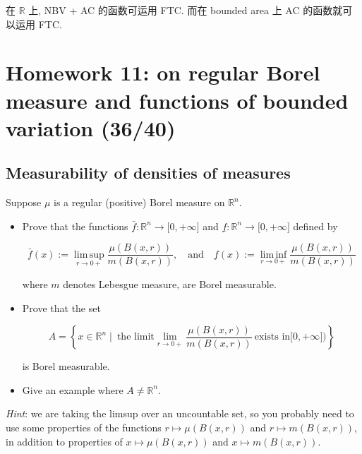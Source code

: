 \documentclass{qlnotes-export}
\begin{document}
在 \(\mathbb{R}\) 上, NBV + AC 的函数可运用 FTC. 而在 bounded area 上 AC 的函数就可以运用 FTC.

\chapter{Homework 11: on regular Borel measure and functions of bounded variation (36/40)}\label{homework-11-on-regular-borel-measure-and-functions-of-bounded-variation-3640}

\section{Measurability of densities of measures}\label{measurability-of-densities-of-measures}

Suppose \(\mu\) is a regular (positive) Borel measure on \({\mathbb{R}}^{n}\).

\begin{itemize}
\item
  Prove that the functions \(\bar{f}:{\mathbb{R}}^{n}\rightarrow\lbrack 0, + \infty\rbrack\) and \(\underset{¯}{f}:{\mathbb{R}}^{n}\rightarrow\lbrack 0, + \infty\rbrack\) defined by

  \[\bar{f}(x) := \operatorname{lim\, sup}\limits_{r\rightarrow 0 +}\frac{\mu(B(x,r))}{m(B(x,r))},\quad\text{and}\quad\underset{¯}{f}(x) := \operatorname{lim\, inf}\limits_{r\rightarrow 0 +}\frac{\mu(B(x,r))}{m(B(x,r))}\]

  where \(m\) denotes Lebesgue measure, are Borel measurable.
\item
  Prove that the set

  \[A = \left\{ {x \in {\mathbb{R}}^{n} \mid \ \text{the limit}\lim\limits_{r\rightarrow 0 +}\frac{\mu(B(x,r))}{m(B(x,r))}\ \text{exists in}\lbrack 0, + \infty\rbrack\text{)}} \right\}\]

  is Borel measurable.
\item
  Give an example where \(A \neq {\mathbb{R}}^{n}\).
\end{itemize}

\emph{Hint}: we are taking the limsup over an uncountable set, so you probably need to use some properties of the functions \(r\mapsto\mu(B(x,r))\) and \(r\mapsto m(B(x,r))\), in addition to properties of \(x\mapsto\mu(B(x,r))\) and \(x\mapsto m(B(x,r))\).
\end{document}
